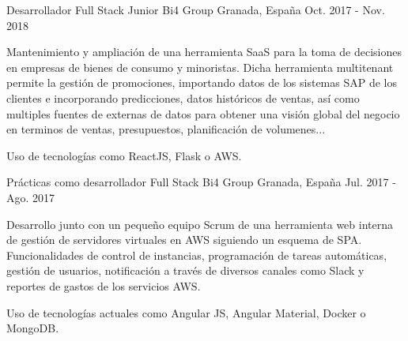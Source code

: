 


\begin{cventries}


\cventry
{Desarrollador Full Stack Junior} %
{Bi4 Group} %
{Granada, España} %
{Oct. 2017 - Nov. 2018} %
{ %
	\begin{cvitems}
		\item {Mantenimiento y ampliación de una herramienta SaaS para la toma de decisiones en empresas de bienes de consumo y minoristas. Dicha herramienta multitenant permite la gestión de promociones, importando datos de los sistemas SAP de los clientes e incorporando predicciones, datos históricos de ventas, así como multiples fuentes de externas de datos para obtener una visión global del negocio en terminos de ventas, presupuestos, planificación de volumenes...}
		\item {Uso de tecnologías como ReactJS, Flask o AWS.}
	\end{cvitems}
}


\cventry
{Prácticas como desarrollador Full Stack } %
{Bi4 Group} %
{Granada, España} %
{Jul. 2017 - Ago. 2017} %
{ %
	\begin{cvitems}
		\item {Desarrollo junto con un pequeño equipo Scrum de una herramienta web interna de gestión de servidores virtuales en AWS siguiendo un esquema de SPA. Funcionalidades de control de instancias, programación de tareas automáticas, gestión de usuarios, notificación a través de diversos canales como Slack y reportes de gastos de los servicios AWS.}
		\item {Uso de tecnologías actuales como Angular JS, Angular Material, Docker o MongoDB.}
	\end{cvitems}
}

\end{cventries}